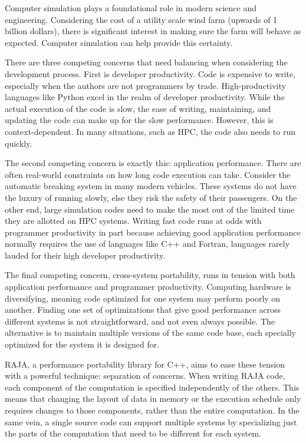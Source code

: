 \documentclass{article}
\begin{document}
Computer simulation plays a foundational role in modern science and engineering. 
Considering the cost of a utility scale wind farm (upwards of 1 billion dollars), there is significant interest in making sure the farm will behave as expected.
Computer simulation can help provide this certainty.

There are three competing concerns that need balancing when considering the development process.
First is developer productivity.
Code is expensive to write, especially when the authors are not programmers by trade.
High-productivity languages like Python excel in the realm of developer productivity.
While the actual execution of the code is slow, the ease of writing, maintaining, and updating the code can make up for the slow performance.
However, this is context-dependent. 
In many situations, such as HPC, the code also needs to run quickly.

The second competing concern is exactly this: application performance.
There are often real-world constraints on how long code execution can take.
Consider the automatic breaking system in many modern vehicles.
These systems do not have the luxury of running slowly, else they risk the safety of their passengers.
On the other end, large simulation codes need to make the most out of the limited time they are allotted on HPC systems.
Writing fast code runs at odds with programmer productivity in part because achieving good application performance normally requires the use of languages like C++ and Fortran, languages rarely lauded for their high developer productivity.

The final competing concern, cross-system portability, runs in tension with both application performance and programmer productivity.
Computing hardware is diversifying, meaning code optimized for one system may perform poorly on another.
Finding one set of optimizations that give good performance across different systems is not straightforward, and not even always possible.
The alternative is to maintain multiple versions of the same code base, each specially optimized for the system it is designed for.

RAJA, a performance portability library for C++, aims to ease these tension with a powerful technique: separation of concerns.
When writing RAJA code, each component of the computation is specified independently of the others.
This means that changing the layout of data in memory or the execution schedule only requires changes to those components, rather than the entire computation.
In the same vein, a single source code can support multiple systems by specializing just the parts of the computation that need to be different for each system.
\end{document}

